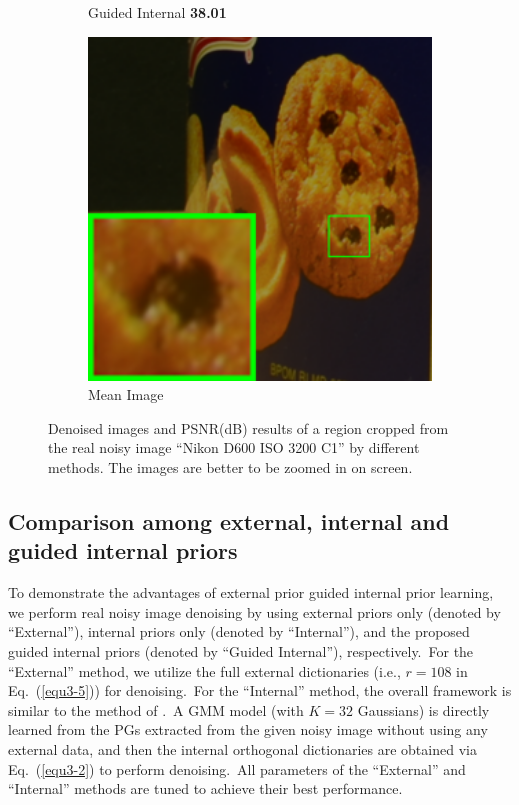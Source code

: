 \begin{figure}
\begin{subfigure}[t]{0.19\textwidth}
\caption{ Guided Internal \textbf{38.01}}
    \end{subfigure}
    \hfill
    \begin{subfigure}[t]{0.19\textwidth}
        \centering
        \includegraphics[width=1\textwidth]{images/guided/resize_br_Mean_CC_Noisy_Nikon_D600_ISO_3200_C1_94b.png}
\caption{Mean Image}
    \end{subfigure}
    \caption{Denoised images and PSNR(dB) results of a region cropped from the real noisy image ``Nikon D600 ISO 3200 C1'' \cite{crosschannel2016} by different methods. The images are better to be zoomed in on screen.}
    \label{fig3-7}
\end{figure}


\subsection{Comparison among external, internal and guided internal priors}

To demonstrate the advantages of external prior guided internal prior learning, we perform real noisy image denoising by using external priors only (denoted by ``External''), internal priors only (denoted by ``Internal''), and the proposed guided internal priors (denoted by ``Guided Internal''), respectively.\ For the ``External'' method, we utilize the full external dictionaries (i.e., $r=108$ in Eq.\ (\ref{equ3-5})) for denoising.\ For the ``Internal'' method, the overall framework is similar to the method of \cite{ncsr}.\ A GMM model (with $K = 32$ Gaussians) is directly learned from the PGs extracted from the given noisy image without using any external data, and then the internal orthogonal dictionaries are obtained via Eq.\ (\ref{equ3-2}) to perform denoising.\ All parameters of the ``External'' and ``Internal'' methods are tuned to achieve their best performance. 


